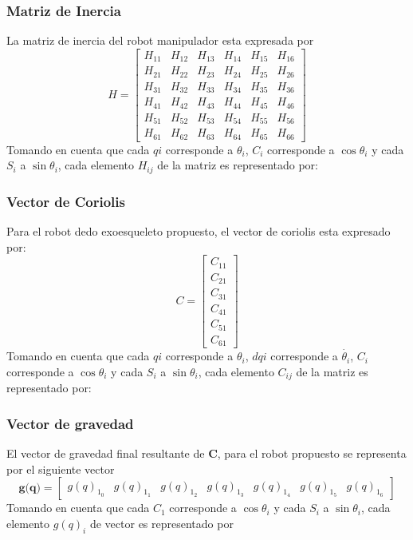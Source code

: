 \documentclass[journal, trans, spanish]{IEEEtran}
\begin{document}
\subsubsection{Matriz de Inercia}
La matriz de inercia del robot manipulador esta expresada por 
\begin{equation*}
    H=\begin{bmatrix} H_{11} & H_{12} & H_{13} & H_{14} & H_15 & H_{16}\\
    H_{21} & H_{22} & H_{23} & H_{24} & H_25 & H_{26}\\
    H_{31} & H_{32} & H_{33} & H_{34} & H_35 & H_{36}\\
    H_{41} & H_{42} & H_{43} & H_{44} & H_45 & H_{46}\\
    H_{51} & H_{52} & H_{53} & H_{54} & H_55 & H_{56}\\
    H_{61} & H_{62} & H_{63} & H_{64} & H_65 & H_{66}
   \end{bmatrix}
\end{equation*}
\noindent Tomando en cuenta que cada $qi$ corresponde a $\theta_i$, $C_i$ corresponde a $\cos \theta_i$ y cada $S_i$ a $\sin \theta_i$, cada elemento $H_{ij}$ de la matriz es representado por:

\subsubsection{Vector de Coriolis}
Para el robot dedo exoesqueleto propuesto, el vector de coriolis esta expresado por:
\begin{equation*}
    C=\begin{bmatrix} C_{11}\\
                      C_{21}\\
                      C_{31}\\
                      C_{41}\\
                      C_{51}\\
                      C_{61}\end{bmatrix}
\end{equation*}
\noindent Tomando en cuenta que cada $qi$ corresponde a $\theta_i$, $dqi$ corresponde a $\dot{\theta_i}$, $C_i$ corresponde a $\cos \theta_i$ y cada $S_i$ a $\sin \theta_i$, cada elemento $C_{ij}$ de la matriz es representado por:


\subsubsection{Vector de gravedad}
El vector de gravedad final resultante de $\textbf{C}$, para el robot propuesto se representa por el siguiente vector
\begin{equation*}
    \textbf{g(q)}= \begin{bmatrix} g(q)_1_0 & g(q)_1_1 & g(q)_1_2 & g(q)_1_3 & g(q)_1_4 &g(q)_1_5 & g(q)_1_6  \end{bmatrix}
\end{equation*}
Tomando en cuenta que cada $C_1$ corresponde a $\cos \theta_i$ y cada $S_i$ a $\sin \theta_i$, cada  elemento $g(q)_i$ de vector es representado por 
\end{document}
